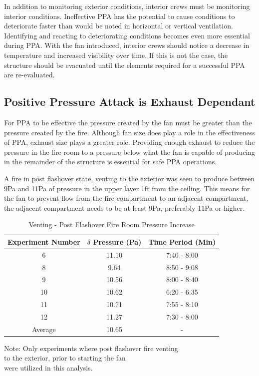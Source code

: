 \documentclass{article}
\begin{document}
In addition to monitoring exterior conditions, interior crews must be monitoring interior conditions. Ineffective PPA has the potential to cause conditions to deteriorate faster than would be noted in horizontal or vertical ventilation. Identifying and reacting to deteriorating conditions becomes even more essential during PPA. With the fan introduced, interior crews should notice a decrease in temperature and increased visibility over time. If this is not the case, the structure should be evacuated until the elements required for a successful PPA are re-evaluated.

\subsection{Positive Pressure Attack is Exhaust Dependant} \label{sec:ExhaustDepend}
For PPA to be effective the pressure created by the fan must be greater than the pressure created by the fire. Although fan size does play a role in the effectiveness of PPA, exhaust size plays a greater role. Providing enough exhaust to reduce the pressure in the fire room to a pressure below what the fan is capable of producing in the remainder of the structure is essential for safe PPA operations.

A fire in post flashover state, venting to the exterior was seen to produce between 9Pa and 11Pa of pressure in the upper layer 1ft from the ceiling. This means for the fan to prevent flow from the fire compartment to an adjacent compartment, the adjacent compartment needs to be at least 9Pa, preferably 11Pa or higher. 

\begin{table} [H]
	\centering
	\caption{Venting - Post Flashover Fire Room Pressure Increase}
	\centering
	
	\begin{tabular}{|c|c|c|}
		\hline
		Experiment Number & $\delta$ Pressure (Pa) & Time Period (Min) \\ \hline \hline
		6 & 11.10 & 7:40 - 8:00 \\ \hline
		8 & 9.64 & 8:50 - 9:08 \\ \hline
		9 & 10.56 & 8:00 - 8:40 \\ \hline
		10 & 10.62 & 6:20 - 6:35 \\ \hline
		11 & 10.71 & 7:55 - 8:10 \\ \hline
		12 & 11.27 & 7:30 - 8:00 \\ \hline
		Average & 10.65 & -  \\ \hline
	\end{tabular}
	
	\begin{tablenotes}
		\centering
		\item Note: Only experiments where post flashover fire venting \\ to the exterior, prior to starting the fan \\ were utilized in this analysis.
	\end{tablenotes}
	\label{tab:FireRoomPressure}
\end{table}
\end{document}
